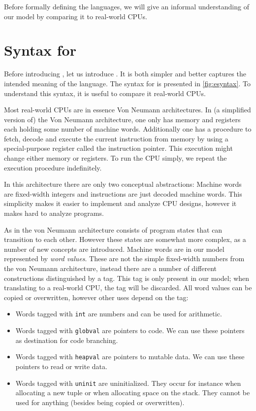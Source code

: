 Before formally defining the languages, we will give an informal understanding
of our model by comparing it to real-world CPUs.

\section{Syntax for \ATALe}

Before introducing \ATAL, let us introduce \ATALe. It is both simpler and better
captures the intended meaning of the language. The syntax for \ATALe is
presented in \cref{fig:esyntax}. To understand this syntax, it is useful to
compare it real-world CPUs.

Most real-world CPUs are in essence Von Neumann architectures. In (a simplified
version of) the Von Neumann architecture, one only has memory and registers each
holding some number of machine words. Additionally one has a procedure to fetch,
decode and execute the current instruction from memory by using a
special-purpose register called the instruction pointer. This execution might
change either memory or registers. To run the CPU simply, we repeat the
execution procedure indefinitely.

In this architecture there are only two conceptual abstractions: Machine words
are fixed-width integers and instructions are just decoded machine words. This
simplicity makes it easier to implement and analyze CPU designs, however it
makes hard to analyze programs.

As in the von Neumann architecture \ATALe consists of program states that can
transition to each other. However these states are somewhat more complex, as a
number of new concepts are introduced. Machine words are in our model
represented by \emph{word values}. These are not the simple fixed-width numbers
from the von Neumann architecture, instead there are a number of different
constructions distinguished by a tag. This tag is only present in our model;
when translating to a real-world CPU, the tag will be discarded. All word values
can be copied or overwritten, however other uses depend on the tag:

\begin{itemize}
\item Words tagged with \texttt{int} are numbers and can be used for
  arithmetic.
\item Words tagged with \texttt{globval} are pointers to code. We can use these
  pointers as destination for code branching.
\item Words tagged with \texttt{heapval} are pointers to mutable data. We can
  use these pointers to read or write data.
\item Words tagged with \texttt{uninit} are uninitialized. They occur for
  instance when allocating a new tuple or when allocating space on the
  stack. They cannot be used for anything (besides being copied or overwritten).
\end{itemize}

